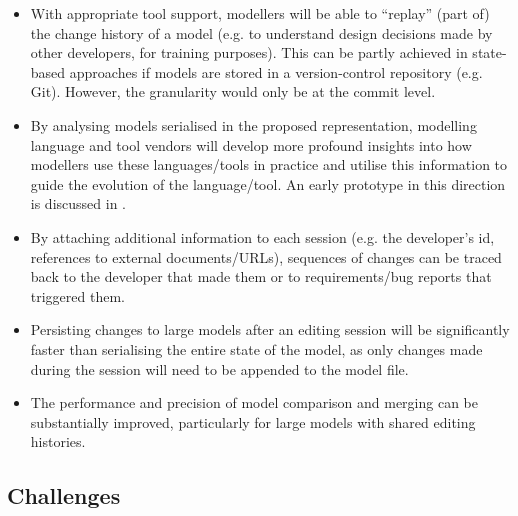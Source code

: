 \begin{itemize}
\item With appropriate tool support, modellers will be able to ``replay'' (part of) the change history of a model (e.g. to understand design decisions made by other developers, for training purposes). This can be partly achieved in state-based approaches if models are stored in a version-control repository (e.g. Git). However, the granularity would only be at the commit level.
\item By analysing models serialised in the proposed representation, modelling language and tool vendors will develop more profound insights into how modellers use these languages/tools in practice and utilise this information to guide the evolution of the language/tool. An early prototype in this direction is discussed in \cite{polack2019towards}.
\item By attaching additional information to each session (e.g. the developer's id, references to external documents/URLs), sequences of changes can be traced back to the developer that made them or to requirements/bug reports that triggered them.
\item Persisting changes to large models after an editing session will be significantly faster than serialising the entire state of the model, as only changes made during the session will need to be appended to the model file.
\item The performance and precision of model comparison and merging can be substantially improved, particularly for large models with shared editing histories.
\end{itemize}

\subsection{Challenges}
\label{sec:challenges}

